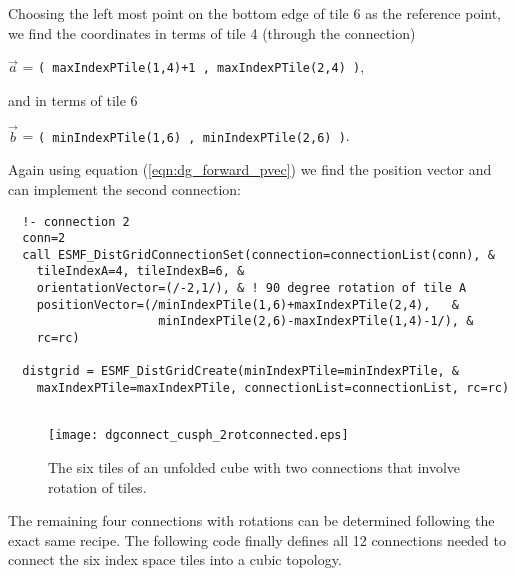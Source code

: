    Choosing the left most point on the bottom edge of tile 6 as the reference
   point, we find the coordinates in terms of tile 4 (through the connection)
  
   $\vec a$ = {\tt ( maxIndexPTile(1,4)+1 , maxIndexPTile(2,4) )},
  
   and in terms of tile 6
  
   $\vec b$ = {\tt ( minIndexPTile(1,6) , minIndexPTile(2,6) )}.
  
   Again using equation (\ref{eqn:dg_forward_pvec}) we find the position vector
   and can implement the second connection: 

 \begin{verbatim}
  !- connection 2
  conn=2
  call ESMF_DistGridConnectionSet(connection=connectionList(conn), &
    tileIndexA=4, tileIndexB=6, &
    orientationVector=(/-2,1/), & ! 90 degree rotation of tile A
    positionVector=(/minIndexPTile(1,6)+maxIndexPTile(2,4),   &
                     minIndexPTile(2,6)-maxIndexPTile(1,4)-1/), &
    rc=rc)

  distgrid = ESMF_DistGridCreate(minIndexPTile=minIndexPTile, &
    maxIndexPTile=maxIndexPTile, connectionList=connectionList, rc=rc)
 
\end{verbatim}
 

   
   \begin{figure}[h]
     \caption{The six tiles of an unfolded cube with two connections that
      involve rotation of tiles.}
     \centering
     \texttt{[image: dgconnect\_cusph\_2rotconnected.eps]}
     \label{fig:dgconnect_cusph_2rotconnected}
   \end{figure}
  
   The remaining four connections with rotations can be determined following the
   exact same recipe. The following code finally defines all 12 connections 
   needed to connect the six index space tiles into a cubic topology. 

